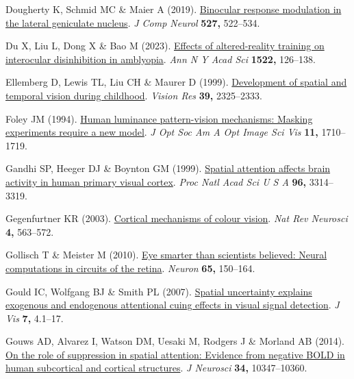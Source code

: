 \documentclass[
  letterpaper,
  DIV=11,
  numbers=noendperiod]{scrartcl}
\newlength{\cslhangindent}
\newenvironment{CSLReferences}[2] %
 {\begin{list}{}{%
  \setlength{\itemindent}{0pt}
  \setlength{\leftmargin}{0pt}
  \setlength{\parsep}{0pt}
  \ifodd #1
   \setlength{\leftmargin}{\cslhangindent}
   \setlength{\itemindent}{-1\cslhangindent}
  \fi
  \setlength{\itemsep}{#2\baselineskip}}}
 {\end{list}}
\begin{document}
\begin{CSLReferences}{1}{1}
Dougherty K, Schmid MC \& Maier A (2019).
\href{https://doi.org/10.1002/cne.24417}{Binocular response modulation
in the lateral geniculate nucleus}. \emph{J Comp Neurol} \textbf{527,}
522--534.

Du X, Liu L, Dong X \& Bao M (2023).
\href{https://doi.org/10.1111/nyas.14969}{Effects of altered-reality
training on interocular disinhibition in amblyopia}. \emph{Ann N Y Acad
Sci} \textbf{1522,} 126--138.

Ellemberg D, Lewis TL, Liu CH \& Maurer D (1999).
\href{https://doi.org/10.1016/s0042-6989(98)00280-6}{Development of
spatial and temporal vision during childhood}. \emph{Vision Res}
\textbf{39,} 2325--2333.

Foley JM (1994). \href{https://doi.org/10.1364/josaa.11.001710}{Human
luminance pattern-vision mechanisms: Masking experiments require a new
model}. \emph{J Opt Soc Am A Opt Image Sci Vis} \textbf{11,} 1710--1719.

Gandhi SP, Heeger DJ \& Boynton GM (1999).
\href{https://doi.org/10.1073/pnas.96.6.3314}{Spatial attention affects
brain activity in human primary visual cortex}. \emph{Proc Natl Acad Sci
U S A} \textbf{96,} 3314--3319.

Gegenfurtner KR (2003). \href{https://doi.org/10.1038/nrn1138}{Cortical
mechanisms of colour vision}. \emph{Nat Rev Neurosci} \textbf{4,}
563--572.

Gollisch T \& Meister M (2010).
\href{https://doi.org/10.1016/j.neuron.2009.12.009}{Eye smarter than
scientists believed: Neural computations in circuits of the retina}.
\emph{Neuron} \textbf{65,} 150--164.

Gould IC, Wolfgang BJ \& Smith PL (2007).
\href{https://doi.org/10.1167/7.13.4}{Spatial uncertainty explains
exogenous and endogenous attentional cuing effects in visual signal
detection}. \emph{J Vis} \textbf{7,} 4.1--17.

Gouws AD, Alvarez I, Watson DM, Uesaki M, Rodgers J \& Morland AB
(2014). \href{https://doi.org/10.1523/JNEUROSCI.0164-14.2014}{On the
role of suppression in spatial attention: Evidence from negative BOLD in
human subcortical and cortical structures}. \emph{J Neurosci}
\textbf{34,} 10347--10360.


\end{CSLReferences}
\end{document}

